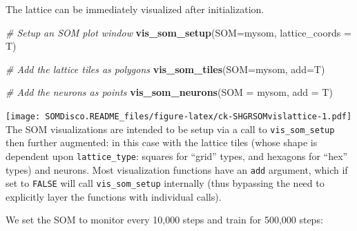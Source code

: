 \documentclass[]{article}
\newenvironment{Shaded}{\begin{snugshade}}{\end{snugshade}}
\newcommand{\CommentTok}[1]{\textcolor[rgb]{0.56,0.35,0.01}{\textit{#1}}}
\newcommand{\DataTypeTok}[1]{\textcolor[rgb]{0.13,0.29,0.53}{#1}}
\newcommand{\DecValTok}[1]{\textcolor[rgb]{0.00,0.00,0.81}{#1}}
\newcommand{\KeywordTok}[1]{\textcolor[rgb]{0.13,0.29,0.53}{\textbf{#1}}}
\newcommand{\NormalTok}[1]{#1}
\newcommand{\OperatorTok}[1]{\textcolor[rgb]{0.81,0.36,0.00}{\textbf{#1}}}
\begin{document}
The lattice can be immediately visualized after initialization.

\begin{Shaded}
\begin{Highlighting}[]
\CommentTok{# Setup an SOM plot window }
\KeywordTok{vis_som_setup}\NormalTok{(}\DataTypeTok{SOM=}\NormalTok{mysom, }\DataTypeTok{lattice_coords =}\NormalTok{ T)}

\CommentTok{# Add the lattice tiles as polygons}
\KeywordTok{vis_som_tiles}\NormalTok{(}\DataTypeTok{SOM=}\NormalTok{mysom, }\DataTypeTok{add=}\NormalTok{T)}

\CommentTok{# Add the neurons as points }
\KeywordTok{vis_som_neurons}\NormalTok{(}\DataTypeTok{SOM =}\NormalTok{ mysom, }\DataTypeTok{add =}\NormalTok{ T)}
\end{Highlighting}
\end{Shaded}

\texttt{[image: SOMDisco.README\_files/figure-latex/ck-SHGRSOMvislattice-1.pdf]}
The SOM visualizations are intended to be setup via a call to \texttt{vis\_som\_setup} then further augmented: in this case with the lattice tiles (whose shape is dependent upon \texttt{lattice\_type}: squares for ``grid'' types, and hexagons for ``hex'' types) and neurons. Most visualization functions have an \texttt{add} argument, which if set to \texttt{FALSE} will call \texttt{vis\_som\_setup} internally (thus bypassing the need to explicitly layer the functions with individual calls).

We set the SOM to monitor every 10,000 steps and train for 500,000 steps:

\begin{Shaded}
\end{Shaded}
\end{document}
